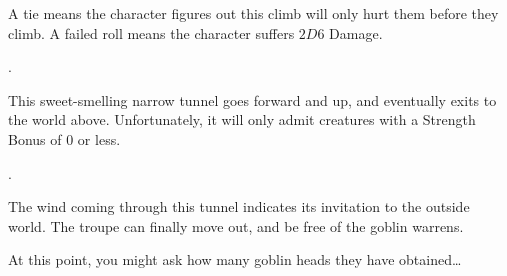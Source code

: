 \begin{multicols}{2}
A tie means the character figures out this climb will only hurt them before they climb.
A failed roll means the character suffers $2D6$ Damage.

.


This sweet-smelling narrow tunnel goes forward and up, and eventually exits to the world above.
Unfortunately, it will only admit creatures with a Strength Bonus of 0 or less.

.


The wind coming through this tunnel indicates its invitation to the outside world.
The troupe can finally move out, and be free of the goblin warrens.

At this point, you might ask how many goblin heads they have obtained\ldots

\end{multicols}
